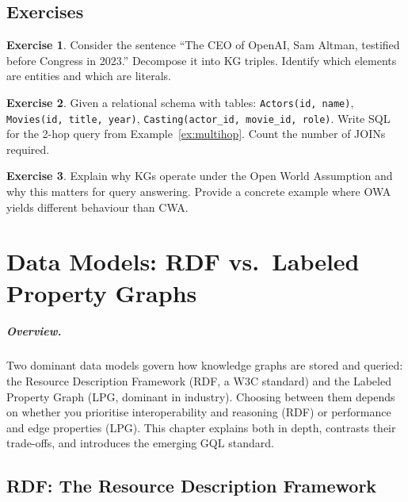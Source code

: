\documentclass[11pt,a4paper,oneside,openany]{book}
\theoremstyle{definition}
\newtheorem{exercise}{Exercise}[chapter]
\theoremstyle{plain}
\theoremstyle{remark}
\begin{document}
\section{Exercises}

\begin{exercise}
	Consider the sentence ``The CEO of OpenAI, Sam Altman, testified before Congress in 2023.'' Decompose it into KG triples. Identify which elements are entities and which are literals.
\end{exercise}

\begin{exercise}
	Given a relational schema with tables: \texttt{Actors(id, name)}, \texttt{Movies(id, title, year)}, \texttt{Casting(actor\_id, movie\_id, role)}. Write SQL for the 2-hop query from Example~\ref{ex:multihop}. Count the number of JOINs required.
\end{exercise}

\begin{exercise}
	Explain why KGs operate under the Open World Assumption and why this matters for query answering. Provide a concrete example where OWA yields different behaviour than CWA.
\end{exercise}

\chapter{Data Models: RDF vs.\ Labeled Property Graphs}\label{ch:datamodels}

\paragraph{Overview.}
Two dominant data models govern how knowledge graphs are stored and queried: the Resource Description Framework (RDF, a W3C standard) and the Labeled Property Graph (LPG, dominant in industry). Choosing between them depends on whether you prioritise interoperability and reasoning (RDF) or performance and edge properties (LPG). This chapter explains both in depth, contrasts their trade-offs, and introduces the emerging GQL standard.

\section{RDF: The Resource Description Framework}\label{sec:rdf}
\end{document}
